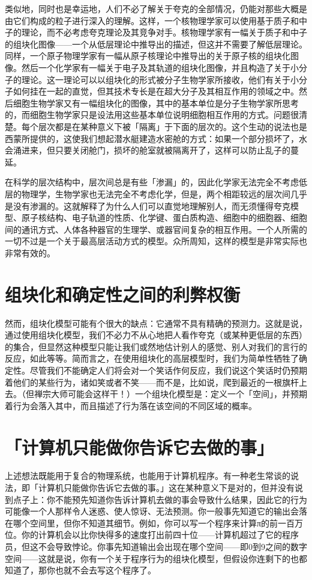 \documentclass[
  12pt,
  twoside,
  openright,
  oldfontcommands,
]{memoir}
\begin{document}
类似地，同时也是幸运地，人们不必了解关于夸克的全部情况，仍能对那些大概是由它们构成的粒子进行深入的理解。这样，一个核物理学家可以使用基于质子和中子的理论，而不必考虑夸克理论及其竞争对手。核物理学家有一幅关于质子和中子的组块化图像------一个从低层理论中推导出的描述，但这并不需要了解低层理论。同样，一个原子物理学家有一幅从原子核理论中推导出的关于原子核的组块化图像。然后一个化学家有一幅关于电子及其轨道的组块化图像，并且构造了关于小分子的理论。这一理论可以以组块化的形式被分子生物学家所接收，他们有关于小分子如何挂在一起的直觉，但其技术专长是在超大分子及其相互作用的领域之中。然后细胞生物学家又有一幅组块化的图像，其中的基本单位是分子生物学家所思考的，而细胞生物学家只是设法用这些基本单位说明细胞相互作用的方式。问题很清楚。每个层次都是在某种意义下被「隔离」于下面的层次的。这个生动的说法也是西蒙所提供的，这使我们想起潜水艇建造水密舱的方式：如果一个部分损坏了，水会涌进来，但只要关闭舱门，损坏的舱室就被隔离开了，这样可以防止乱子的蔓延。

在科学的层次结构中，层次间总是有些「渗漏」的，因此化学家无法完全不考虑低层的物理学，生物学家也无法完全不考虑化学，但是，两个相距较远的层次间几乎是没有渗漏的。这就解释了为什么人们可以直觉地理解别人，而无须懂得夸克模型、原子核结构、电子轨道的性质、化学键、蛋白质构造、细胞中的细胞器、细胞间的通讯方式、人体各种器官的生理学、或器官间复杂的相互作用。一个人所需的一切不过是一个关于最高层活动方式的模型。众所周知，这样的模型是非常实际也非常有效的。

\section{组块化和确定性之间的利弊权衡}

然而，组块化模型可能有个很大的缺点：它通常不具有精确的预测力。这就是说，通过使用组块化模型，我们不必力不从心地把人看作夸克（或某种更低层的东西）的集合，但显然这种模型只能让我们或然地估计别人的感觉、别人对我们的言行的反应，如此等等。简而言之，在使用组块化的高层模型时，我们为简单性牺牲了确定性。尽管我们不能确定人们将会对一个笑话作何反应，我们说这个笑话时仍预期着他们的某些行为，诸如笑或者不笑------而不是，比如说，爬到最近的一根旗杆上去。（但禅宗大师可能会这样干！）一个组块化模型是：定义一个「空间」，并预期着行为会落入其中，而且描述了行为落在该空间的不同区域的概率。

\section{「计算机只能做你告诉它去做的事」}

上述想法既能用于复合的物理系统，也能用于计算机程序。有一种老生常谈的说法，即「计算机只能做你告诉它去做的事。」这在某种意义下是对的，但并没有说到点子上：你不能预先知道你告诉计算机去做的事会导致什么结果，因此它的行为可能像一个人那样令人迷惑、使人惊讶、无法预测。你一般事先知道它的输出会落在哪个空间里，但你不知道其细节。例如，你可以写一个程序来计算π的前一百万位。你的计算机会以比你快得多的速度打出前四十位------计算机超过了它的程序员，但这不会导致悖论。你事先知道输出会出现在哪个空间------即0到9之间的数字空间------这就是说，你有一个关于程序行为的组块化模型，但假设你连剩下的也都知道了，那你也就不会去写这个程序了。
\end{document}
